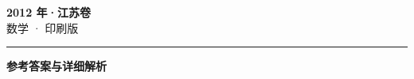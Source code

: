 \documentclass[zihao=5, a4paper]{ctexart}
\begin{document}
\begin{center}
  {\Large\bfseries 2012 年·江苏卷}\\[4pt]
  {\large 数学 · 印刷版}
\end{center}
\medskip
{}

\par\bigskip\hrule\bigskip
{}
\Needspace{0.55\textheight}
\begin{center}{\large\bfseries 参考答案与详细解析}\end{center}
\smallskip

\end{document}
